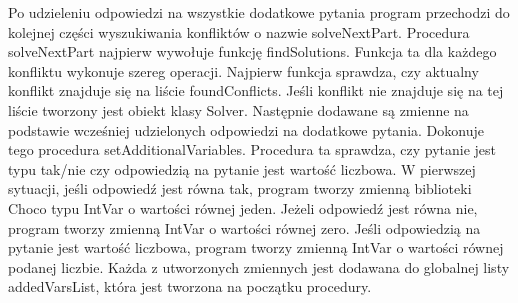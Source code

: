 Po udzieleniu odpowiedzi na wszystkie dodatkowe pytania program przechodzi do kolejnej części wyszukiwania konfliktów o nazwie solveNextPart. Procedura solveNextPart najpierw wywołuje funkcję findSolutions. 
Funkcja ta dla każdego konfliktu wykonuje szereg operacji. Najpierw funkcja sprawdza, czy aktualny konflikt znajduje się na liście foundConflicts. Jeśli konflikt nie znajduje się na tej liście tworzony jest obiekt klasy Solver. Następnie dodawane są zmienne na podstawie wcześniej udzielonych odpowiedzi na dodatkowe pytania. Dokonuje tego procedura setAdditionalVariables. Procedura ta sprawdza, czy pytanie jest typu tak/nie czy odpowiedzią na pytanie jest wartość liczbowa. W pierwszej sytuacji, jeśli odpowiedź jest równa tak, program tworzy zmienną biblioteki Choco typu IntVar o wartości równej jeden. Jeżeli odpowiedź jest równa nie, program tworzy zmienną IntVar o wartości równej zero. Jeśli odpowiedzią na pytanie jest wartość liczbowa, program tworzy zmienną IntVar o wartości równej podanej liczbie. Każda z utworzonych zmiennych jest dodawana do globalnej listy addedVarsList, która jest tworzona na początku procedury. 

